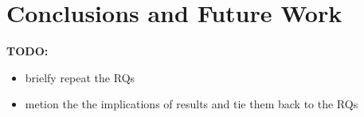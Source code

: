 \section{Conclusions and Future Work} %
\label{sec:conclusion}
\textbf{TODO:}
\begin{itemize}
    \item brielfy repeat the RQs
    \item metion the the implications of results and tie them back to the RQs
\end{itemize}